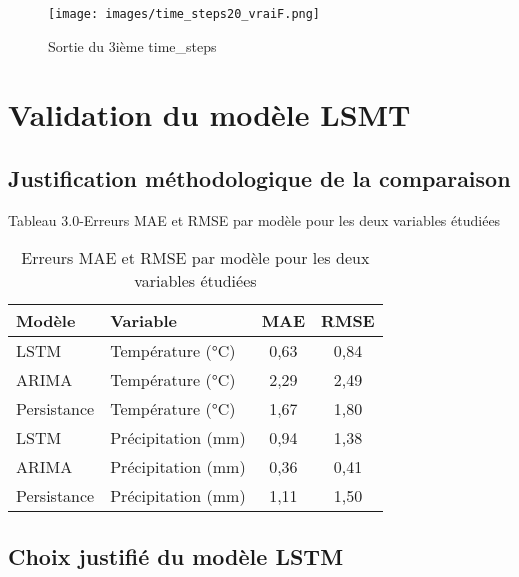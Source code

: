 \documentclass[a4paper,12pt,openany]{report}
\begin{document}
\begin{figure}[H]
\begin{center}
		 \begin{minipage}{\textwidth}
		    \begin{center}
		    \texttt{[image: images/time\_steps20\_vraiF.png]}
		    \end{center}
		    \end{minipage}

	
	\caption{Sortie du 3ième time\_steps\label{Fig 3.4}}
\end{center}
\end{figure}%

\section{Validation du modèle LSMT  }
		\subsection{Justification méthodologique de la comparaison}
	\begin{center}
		\begin{table}
		\caption{Erreurs MAE et RMSE par modèle pour les deux variables étudiées}
		Tableau 3.0-Erreurs MAE et RMSE par modèle pour les deux variables étudiées
		
		\begin{tabular}{|l|l|c|c|}
			\hline
			\textbf{Modèle} & \textbf{Variable} & \textbf{MAE} & \textbf{RMSE} \\
			\hline
			LSTM & Température (°C)   & 0{,}63 & 0{,}84 \\
			\hline
			ARIMA & Température (°C)  & 2{,}29 & 2{,}49 \\
			\hline
			Persistance & Température (°C) & 1{,}67 & 1{,}80 \\
			\hline
			\hline
			LSTM & Précipitation (mm) & 0{,}94 & 1{,}38 \\
			\hline
			ARIMA & Précipitation (mm) & 0{,}36 & 0{,}41 \\
			\hline
			Persistance & Précipitation (mm) & 1{,}11 & 1{,}50 \\
			\hline
		\end{tabular}
		\label{tab:resultats_mae_rmse}
	\end{table}
	\end{center}
	
	\subsection{Choix justifié du modèle LSTM}
	
\end{document}
